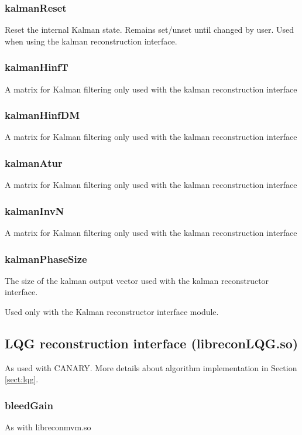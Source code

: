 \documentclass[a4,10pt]{article}
\begin{document}
\subsubsection{kalmanReset}
Reset the internal Kalman state.  Remains set/unset until changed by
user.  Used when using the kalman reconstruction interface.

\subsubsection{kalmanHinfT}
A matrix for Kalman filtering only used with the kalman reconstruction interface

\subsubsection{kalmanHinfDM}
A matrix for Kalman filtering only used with the kalman reconstruction interface

\subsubsection{kalmanAtur}
A matrix for Kalman filtering only used with the kalman reconstruction interface

\subsubsection{kalmanInvN}
A matrix for Kalman filtering only used with the kalman reconstruction interface

\subsubsection{kalmanPhaseSize}
The size of the kalman output vector used with the kalman
reconstructor interface.

Used only with the Kalman reconstructor interface module.

\subsection{LQG reconstruction interface (libreconLQG.so)}
As used with CANARY.  More details about algorithm implementation in
Section \ref{sect:lqg}.

\subsubsection{bleedGain}
As with libreconmvm.so
\end{document}
